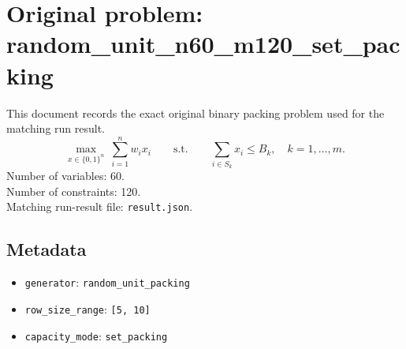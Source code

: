 \documentclass[11pt]{article}
\begin{document}
\section*{Original problem: random\_unit\_n60\_m120\_set\_packing}
This document records the exact original binary packing problem used for the matching run result.
\[
\max_{x\in\{0,1\}^n}\ \sum_{i=1}^n w_i x_i
\qquad\text{s.t.}\qquad
\sum_{i\in S_k} x_i \le B_k,\quad k=1,\dots,m.
\]
Number of variables: 60.\\
Number of constraints: 120.\\
Matching run-result file: \texttt{result.json}.
\subsection*{Metadata}
\begin{itemize}
\item \texttt{generator}: \texttt{random\_unit\_packing}
\item \texttt{row\_size\_range}: \texttt{[5, 10]}
\item \texttt{capacity\_mode}: \texttt{set\_packing}
\end{itemize}
\end{document}
